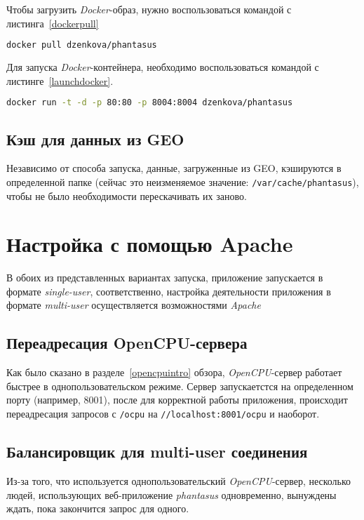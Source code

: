 Чтобы загрузить \emph{Docker}-образ, нужно воспользоваться командой с листинга~\ref{dockerpull}
\begin{lstlisting}[float=!h,language=bash,label={dockerpull},caption={Загрузка Docker-образа phantasus}]
  docker pull dzenkova/phantasus
\end{lstlisting}

Для запуска \emph{Docker}-контейнера, необходимо воспользоваться командой с листинге~\ref{launchdocker}.
\begin{lstlisting}[float=!h,language=bash,label={launchdocker},caption={Запуск Docker-контейнера}]
  docker run -t -d -p 80:80 -p 8004:8004 dzenkova/phantasus
\end{lstlisting}

\subsection{Кэш для данных из GEO}
Независимо от способа запуска, данные, загруженные из GEO, кэшируются в определенной папке (сейчас это неизменяемое значение: \texttt{/var/cache/phantasus}), чтобы не было необходимости перескачивать их заново.

\section{Настройка с помощью Apache}
В обоих из представленных вариантах запуска, приложение запускается в формате \emph{single-user}, соответственно, настройка деятельности приложения в формате \emph{multi-user} осуществляется возможностями \emph{Apache}

\subsection{Переадресация OpenCPU-сервера}
Как было сказано в разделе~\ref{opencpuintro} обзора, \emph{OpenCPU}-сервер работает быстрее в однопользовательском режиме. Сервер запускаетстся на определенном порту (например, 8001), после для корректной работы приложения, происходит переадресация запросов с \texttt{/ocpu} на \texttt{//localhost:8001/ocpu} и наоборот.

\subsection{Балансировщик для multi-user соединения}
Из-за того, что используется однопользовательский \emph{OpenCPU}-сервер, несколько людей, использующих веб-приложение \emph{phantasus} одновременно, вынуждены ждать, пока закончится запрос для одного.

